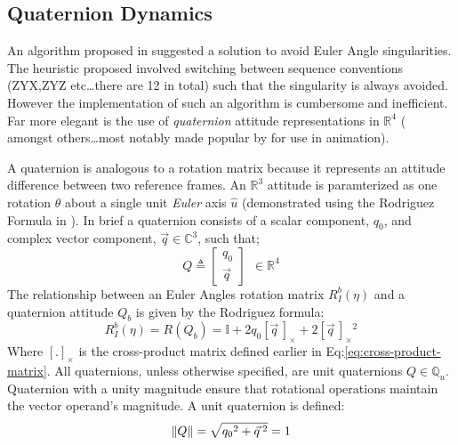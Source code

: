 \subsection{Quaternion Dynamics}
\label{subsec:dynamics.rigidbody.quaternion}
An algorithm proposed in \cite{euleranglesingularity} suggested a solution to avoid Euler Angle singularities. The heuristic proposed involved switching between sequence conventions (ZYX,ZYZ etc\ldots there are 12 in total) such that the singularity is always avoided. However the implementation of such an algorithm is cumbersome and inefficient. Far more elegant is the use of \emph{quaternion} attitude representations in $\mathbb{R}^4$ (\cite{rotationsequences,quaterniondynamics,spacecraftattitutdequaternions} amongst others\ldots most notably made popular by \cite{shoemake} for use in animation).
\par
A quaternion is analogous to a rotation matrix because it represents an attitude difference between two reference frames. An $\mathbb{R}^3$ attitude is paramterized as one rotation $\theta$ about a single unit \emph{Euler} axis $\hat{u}$ (demonstrated using the Rodriguez Formula in \cite{unwinding}). In brief a quaternion consists of a scalar component, $q_0$, and complex vector component, $\vec{q}\in \mathbb{C}^3$, such that;
\begin{equation}
Q\triangleq 
\begin{bmatrix}
q_0 \\
\vec{q}
\end{bmatrix}
~~\in\mathbb{R}^4
\end{equation}
The relationship between an Euler Angles rotation matrix $R_I^b(\eta)$ and a quaternion attitude $Q_b$ is given by the Rodriguez formula:
\begin{equation}\label{eq:rodriguez}
R_I^b(\eta)=R(Q_b)=\mathbb{I}+2q_0[\vec{q}\hspace{2pt}]_\times+2[\vec{q}\hspace{2pt}]_\times\text{}^2
\end{equation}
Where $[.]_\times$ is the cross-product matrix defined earlier in Eq:\ref{eq:cross-product-matrix}. All quaternions, unless otherwise specified, are unit quaternions $Q\in\mathbb{Q}_u$. Quaternion with a unity magnitude ensure that rotational operations maintain the vector operand's magnitude. A unit quaternion is defined:
\begin{equation}
\left\lVert Q\right\rVert=\sqrt{{q_0}^2+\vec{q}\text{}\hspace{2pt}^2}=1
\end{equation}

